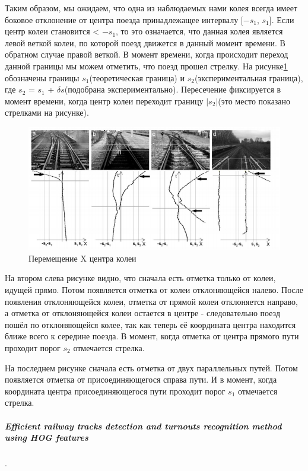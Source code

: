 Таким образом, мы ожидаем, что одна из наблюдаемых нами колея всегда имеет боковое отклонение от центра поезда принадлежащее интервалу [$-s_1$, $s_1$].
Если центр колеи становится < $-s_1$, то это означается, что данная колея является левой веткой колеи, по которой поезд движется в данный момент времени. В обратном случае правой веткой. В момент времени, когда происходит переход данной границы мы можем отметить, что поезд прошел стрелку.
На рисунке\ref{fig:screenshot008} обозначены границы $s_1$(теоретическая граница) и $s_2$(экспериментальная граница), где $s_2$ = $s_1$ + $\delta s$(подобрана экспериментально). Пересечение фиксируется в момент времени, когда центр колеи переходит границу $|s_2|$(это место показано стрелками на рисунке).
\begin{figure}[!h]
	\centering
	\includegraphics[width=1\linewidth]{pictures/screenshot008}
	\caption{Перемещение X центра колеи}
	\label{fig:screenshot008}
\end{figure}

На втором слева рисунке видно, что сначала есть отметка только от колеи, идущей прямо. Потом появляется отметка от колеи отклоняющейся налево. После появления отклоняющейся колеи, отметка от прямой колеи отклоняется направо, а отметка от отклоняющейся колеи остается в центре - следовательно поезд пошёл по отклоняющейся колее, так как теперь её координата центра находится ближе всего к середине поезда. В момент, когда отметка от центра прямого пути проходит порог $s_2$ отмечается стрелка.

На последнем рисунке сначала есть отметка от двух параллельных путей. Потом появляется отметка от присоединяющегося справа пути. И в момент, когда координата центра присоединяющегося пути проходит порог $s_1$ отмечается стрелка.

\subparagraph{Efficient railway tracks detection and turnouts recognition method using HOG features \cite{b:growing_up}}.
\label{growing_up}

